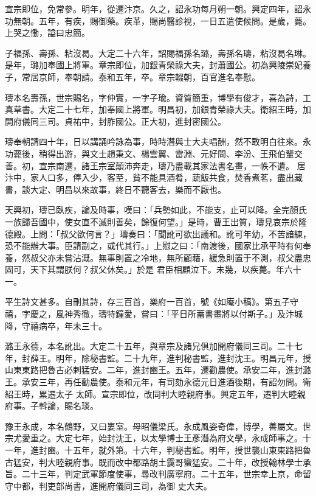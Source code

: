 \begin{pinyinscope}
 宣宗即位，免常參。明年，從遷汴京。久之，詔永功每月朔一朝。興定四年，詔永功無朝。五年，有疾，賜御藥。疾革，賜尚醫診視，一日五遣使候問。是歲，薨。上哭之慟，謚曰忠簡。



 子福孫、壽孫、粘沒曷。大定二十六年，詔賜福孫名璐，壽孫名璹，粘沒曷名琳。是年，璐加奉國上將軍。章宗即位，加銀青榮祿大夫，封蕭國公。初為興陵崇妃養
 子，常居京師，奉朝請。泰和五年，卒。章宗輟朝，百官進名奉慰。



 璹本名壽孫，世宗賜名，字仲實，一字子瑜。資質簡重，博學有俊才，喜為詩，工真草書。大定二十七年，加奉國上將軍。明昌初，加銀青榮祿大夫。衛紹王時，加開府儀同三司。貞祐中，封胙國公。正大初，進封密國公。



 璹奉朝請四十年，日以講誦吟詠為事，時時潛與士大夫唱酬，然不敢明白往來。永功薨後，稍得出游，與文士趙秉文、楊雲翼、雷淵、元好問、李汾、王飛伯輩交善。初，宣宗南遷，諸王宗室顛沛奔走，璹乃盡載其家法書名畫，一帙不遺。
 居汴中，家人口多，俸入少，客至，貧不能具酒肴，蔬飯共食，焚香煮茗，盡出藏書，談大定、明昌以來故事，終日不聽客去，樂而不厭也。



 天興初，璹已臥疾，論及時事，嘆曰：「兵勢如此，不能支，止可以降。全完顏氏一族歸吾國中，使女直不滅則善矣，餘復何望。」是時，曹王出質，璹見哀宗於隆德殿。上問：「叔父欲何言？」璹奏曰：「聞訛可欲出議和。訛可年幼，不苦諳練，恐不能辦大事。臣請副之，或代其行。」上慰之曰：「南渡後，國家比承平時有何奉養，然叔父亦未嘗沾溉。無事則置之冷地，無所顧藉，緩急則置于不測，叔父盡忠固可，天下其謂朕何？叔父休矣。」於是
 君臣相顧泣下。未幾，以疾薨。年六十一。



 平生詩文甚多。自刪其詩，存三百首，樂府一百首，號《如庵小稿》。第五子守禧，字慶之，風神秀徹，璹特鐘愛，嘗曰：「平日所蓄書畫將以付斯子。」及汴城降，守禧病卒，年未三十。



 潞王永德，本名訛出。大定二十五年，與章宗及諸兄俱加開府儀同三司。二十七年，封薛王。明年，除秘書監。二十九年，進判秘書監，進封沈王。明昌元年，授山東東路把魯古必剌猛安。二年，進封豳王。五年，遷勸農使。承安二年，進封潞王。承安三年，再任勸農使。泰和元年，有司劾永德元日進酒後期，有詔勿問。衛紹王時，累遷太子
 太師。宣宗即位，改同判大睦親府事。興定五年，遷判大睦親府事。子斡論，賜名琰。



 豫王永成，本名鶴野，又曰婁室。母昭儀梁氏。永成風姿奇偉，博學，善屬文。世宗尤愛重之。大定七年，始封沈王，以太學博士王彥潛為府文學，永成師事之。十一年，進封豳。十五年，就外第。十六年，判秘書監。明年，授世襲山東東路把魯古猛安，判大睦親府事。既而改中都路胡土靄哥蠻猛安。二十年，改授翰林學士承旨。二十三年，判定武軍節度使事，尋改判廣寧府。二十五年，世宗幸上京，命留守中都，判吏部尚書，進開府儀同三司，為御
 史大夫。




\end{pinyinscope}
